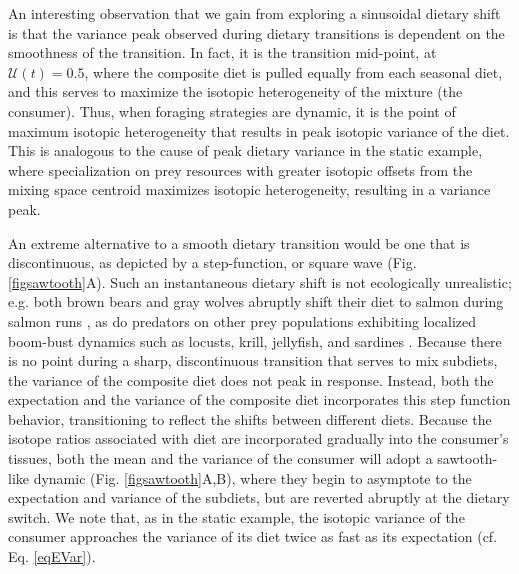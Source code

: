 \documentclass{article}
\begin{document}
An interesting observation that we gain from exploring a sinusoidal dietary shift is that the variance peak observed during dietary transitions is dependent on the smoothness of the transition.
In fact, it is the transition mid-point, at $\mathcal{U}(t) = 0.5$, where the composite diet is pulled equally from each seasonal diet, and this serves to maximize the isotopic heterogeneity of the mixture (the consumer).
Thus, when foraging strategies are dynamic, it is the point of maximum isotopic heterogeneity that results in peak isotopic variance of the diet.
This is analogous to the cause of peak dietary variance in the static example, where specialization on prey resources with greater isotopic offsets from the mixing space centroid maximizes isotopic heterogeneity, resulting in a variance peak.

An extreme alternative to a smooth dietary transition would be one that is discontinuous, as depicted by a step-function, or square wave (Fig. \ref{figsawtooth}A).
Such an instantaneous dietary shift is not ecologically unrealistic; e.g. both brown bears and gray wolves abruptly shift their diet to salmon during salmon runs \citep{Hilderbrand:1999kq,Darimont:2002ex,Levi:2012ir}, as do predators on other prey populations exhibiting localized boom-bust dynamics such as locusts, krill, jellyfish, and sardines \citep{Dawson:2008hj,Atkinson:2014jm}.
Because there is no point during a sharp, discontinuous transition that serves to mix subdiets, the variance of the composite diet does not peak in response.
Instead, both the expectation and the variance of the composite diet incorporates this step function behavior, transitioning to reflect the shifts between different diets.
Because the isotope ratios associated with diet are incorporated gradually into the consumer's tissues, both the mean and the variance of the consumer will adopt a sawtooth-like dynamic (Fig. \ref{figsawtooth}A,B), where they begin to asymptote to the expectation and variance of the subdiets, but are reverted abruptly at the dietary switch.
We note that, as in the static example, the isotopic variance of the consumer approaches the variance of its diet twice as fast as its expectation (cf. Eq. \ref{eqEVar}).
\end{document}
